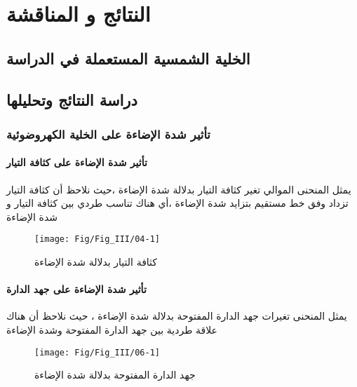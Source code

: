 \chapter{النتائج و المناقشة } %

\label{Chapter3} %

\section{  الخلية الشمسية المستعملة في الدراسة  }
 \section{ دراسة النتائج وتحليلها }
 \subsection{ تأثير شدة الإضاءة على  الخلية الكهروضوئية   }
 \subsubsection{ تأثير  شدة الإضاءة على كثافة التيار}
 يمثل المنحنى الموالي تغير كثافة التيار بدلالة شدة الإضاءة ،حيث نلاحظ أن كثافة التيار تزداد وفق خط مستقيم بتزايد شدة الإضاءة ،أي هناك تناسب طردي بين كثافة التيار و شدة الإضاءة 
 \begin{figure}[h!]
 	\centering
 	\texttt{[image: Fig/Fig\_III/04-1]}
 	\caption{كثافة التيار بدلالة شدة الإضاءة}
 	\label{fig:04-1}
 \end{figure}
\FloatBarrier
  
 
 \subsubsection{ تأثير   شدة  الإضاءة على  جهد الدارة}
 يمثل المنحنى تغيرات جهد الدارة المفتوحة بدلالة شدة الإضاءة ، حيث نلاحظ أن هناك علاقة طردية بين جهد الدارة المفتوحة وشدة الإضاءة 
 \begin{figure}[h!]
 	\centering
 	\texttt{[image: Fig/Fig\_III/06-1]}
 	\caption{جهد الدارة المفتوحة بدلالة شدة الإضاءة}
 	\label{fig:06-1}
 \end{figure}
 
